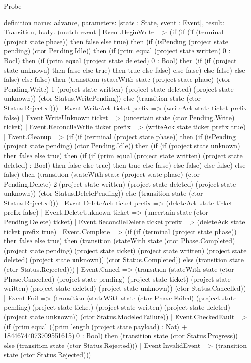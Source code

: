 \begin{lexlean}{Probe}
\begin{semanticmodule}
definition{
  name: advance,
  parameters: [state : State, event : Event],
  result: Transition,
  body: (match event
    | Event.BeginWrite => (if (if (if (terminal (project state phase)) then false else true) then (if (isPending (project state pending) (ctor Pending.Idle)) then (if (prim equal (project state written) 0 : Bool) then (if (prim equal (project state deleted) 0 : Bool) then (if (if (project state unknown) then false else true) then true else false) else false) else false) else false) else false) then (transition (stateWith state (project state phase) (ctor Pending.Write) 1 (project state written) (project state deleted) (project state unknown)) (ctor Status.WritePending)) else (transition state (ctor Status.Rejected)))
    | Event.WriteAck ticket prefix => (writeAck state ticket prefix false)
    | Event.WriteUnknown ticket => (uncertain state (ctor Pending.Write) ticket)
    | Event.ReconcileWrite ticket prefix => (writeAck state ticket prefix true)
    | Event.Cleanup => (if (if (terminal (project state phase)) then (if (isPending (project state pending) (ctor Pending.Idle)) then (if (if (project state unknown) then false else true) then (if (if (prim equal (project state written) (project state deleted) : Bool) then false else true) then true else false) else false) else false) else false) then (transition (stateWith state (project state phase) (ctor Pending.Delete) 2 (project state written) (project state deleted) (project state unknown)) (ctor Status.DeletePending)) else (transition state (ctor Status.Rejected)))
    | Event.DeleteAck ticket prefix => (deleteAck state ticket prefix false)
    | Event.DeleteUnknown ticket => (uncertain state (ctor Pending.Delete) ticket)
    | Event.ReconcileDelete ticket prefix => (deleteAck state ticket prefix true)
    | Event.Complete => (if (if (terminal (project state phase)) then false else true) then (transition (stateWith state (ctor Phase.Completed) (project state pending) (project state ticket) (project state written) (project state deleted) (project state unknown)) (ctor Status.Completed)) else (transition state (ctor Status.Rejected)))
    | Event.Cancel => (transition (stateWith state (ctor Phase.Cancelled) (project state pending) (project state ticket) (project state written) (project state deleted) (project state unknown)) (ctor Status.Cancelled))
    | Event.Fail => (transition (stateWith state (ctor Phase.Failed) (project state pending) (project state ticket) (project state written) (project state deleted) (project state unknown)) (ctor Status.ModeledFailure))
    | Event.CheckedFault => (if (prim equal ((prim length (project state payload) : Nat) + 18446744073709551615) 0 : Bool) then (transition state (ctor Status.Progress)) else (transition state (ctor Status.Rejected)))
    | Event.InvalidEvent => (transition state (ctor Status.Rejected)))
}


\end{semanticmodule}
\end{lexlean}
